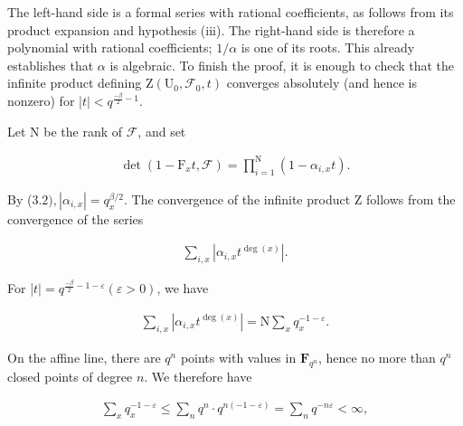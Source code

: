 \documentclass[10pt,leqno]{article}
\begin{document}
\noindent The left-hand side is a formal series with rational coefficients, as follows from its product expansion and hypothesis (iii). The right-hand side is therefore a polynomial with rational coefficients; \(1/\alpha \) is one of its roots. This already establishes that \(\alpha \) is algebraic. To finish the proof, it is enough to check that the infinite product defining \(\mathrm{Z}(\mathrm{U}_{0},\mathcal{F} _{0},t)\) converges absolutely (and hence is nonzero) for |\(t|<q^{\frac{-\beta}{2}- 1}\).\par

\noindent Let \(\mathrm{N}\) be the rank of \(\mathcal{F} \), and set\par

\begin{equation*}\begin{gathered}\operatorname{det}(1- \mathrm{F}_{x} t,\mathcal{F} ) = \prod _{i=1}^{\mathrm{N}} (1- \alpha _{i,x}t).\end{gathered}\end{equation*}

\noindent By (\(3.2), |\alpha _{i,x}|=q_{x}^{\beta /2}\). The convergence of the infinite product \(\mathrm{Z}\) follows from the convergence of the series\par

\begin{equation*}\begin{gathered}\sum _{i,x} |\alpha _{i,x}t^{\operatorname{deg}(x)}|.\end{gathered}\end{equation*}

\noindent For |\(t|=q^{\frac{-\beta}{2}- 1- \varepsilon } (\varepsilon >0)\), we have\par

\begin{equation*}\begin{gathered}\sum _{i,x} |\alpha _{i,x}t^{\operatorname{deg}(x)}| = \mathrm{N}\sum _{x} q_{x}^{- 1- \varepsilon }.\end{gathered}\end{equation*}

\noindent On the affine line, there are \(q^{n}\) points with values in \(\mathbf{F}_{q^{n}}\), hence no more than \(q^{n}\) closed points of degree \(n\). We therefore have\par

\begin{equation*}\begin{gathered}\sum _{x} q_{x}^{- 1- \varepsilon } \leq  \sum _{n} q^{n}\cdot q^{n(- 1- \varepsilon )} = \sum _{n} q^{- n\varepsilon } < \infty ,\end{gathered}\end{equation*}
\end{document}
